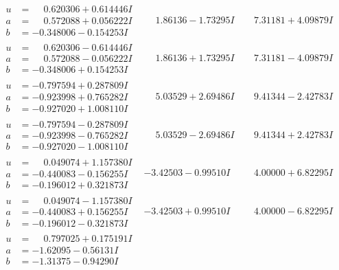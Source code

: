 \documentclass[1p]{elsarticle_modified}
\theoremstyle{definition}
\begin{document}
$$\begin{array}{c|c|c}
\begin{aligned}
u &= \phantom{-}0.620306 + 0.614446 I \\
a &= \phantom{-}0.572088 + 0.056222 I \\
b &= -0.348006 - 0.154253 I\end{aligned}
 & \phantom{-}1.86136 - 1.73295 I & \phantom{-}7.31181 + 4.09879 I \\ \hline\begin{aligned}
u &= \phantom{-}0.620306 - 0.614446 I \\
a &= \phantom{-}0.572088 - 0.056222 I \\
b &= -0.348006 + 0.154253 I\end{aligned}
 & \phantom{-}1.86136 + 1.73295 I & \phantom{-}7.31181 - 4.09879 I \\ \hline\begin{aligned}
u &= -0.797594 + 0.287809 I \\
a &= -0.923998 + 0.765282 I \\
b &= -0.927020 + 1.008110 I\end{aligned}
 & \phantom{-}5.03529 + 2.69486 I & \phantom{-}9.41344 - 2.42783 I \\ \hline\begin{aligned}
u &= -0.797594 - 0.287809 I \\
a &= -0.923998 - 0.765282 I \\
b &= -0.927020 - 1.008110 I\end{aligned}
 & \phantom{-}5.03529 - 2.69486 I & \phantom{-}9.41344 + 2.42783 I \\ \hline\begin{aligned}
u &= \phantom{-}0.049074 + 1.157380 I \\
a &= -0.440083 - 0.156255 I \\
b &= -0.196012 + 0.321873 I\end{aligned}
 & -3.42503 - 0.99510 I & \phantom{-}4.00000 + 6.82295 I \\ \hline\begin{aligned}
u &= \phantom{-}0.049074 - 1.157380 I \\
a &= -0.440083 + 0.156255 I \\
b &= -0.196012 - 0.321873 I\end{aligned}
 & -3.42503 + 0.99510 I & \phantom{-}4.00000 - 6.82295 I \\ \hline\begin{aligned}
u &= \phantom{-}0.797025 + 0.175191 I \\
a &= -1.62095 - 0.56131 I \\
b &= -1.31375 - 0.94290 I\end{aligned}

\end{array}$$
\end{document}
